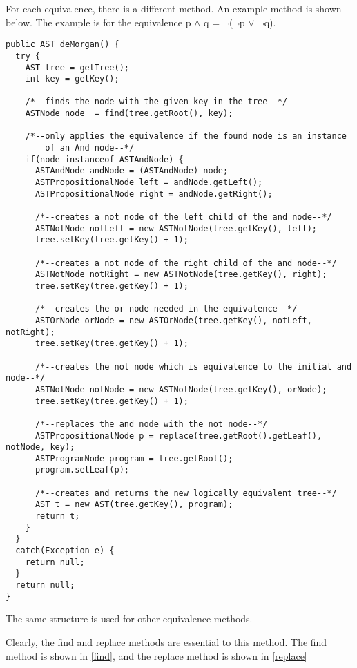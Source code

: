 \documentclass{report}
\begin{document}
For each equivalence, there is a different method. An example method is shown below. The
example is for the equivalence  p $\land$ q = $\neg$($\neg$p $\lor$ $\neg$q).

\begin{lstlisting}[caption=Example of an equivalence method, label=equiveg]
public AST deMorgan() {
  try {
    AST tree = getTree();
    int key = getKey();
		
    /*--finds the node with the given key in the tree--*/
    ASTNode node  = find(tree.getRoot(), key);

    /*--only applies the equivalence if the found node is an instance
        of an And node--*/
    if(node instanceof ASTAndNode) {
      ASTAndNode andNode = (ASTAndNode) node;
      ASTPropositionalNode left = andNode.getLeft();
      ASTPropositionalNode right = andNode.getRight();

      /*--creates a not node of the left child of the and node--*/
      ASTNotNode notLeft = new ASTNotNode(tree.getKey(), left);
      tree.setKey(tree.getKey() + 1);

      /*--creates a not node of the right child of the and node--*/
      ASTNotNode notRight = new ASTNotNode(tree.getKey(), right);
      tree.setKey(tree.getKey() + 1);

      /*--creates the or node needed in the equivalence--*/
      ASTOrNode orNode = new ASTOrNode(tree.getKey(), notLeft, notRight);
      tree.setKey(tree.getKey() + 1);

      /*--creates the not node which is equivalence to the initial and node--*/
      ASTNotNode notNode = new ASTNotNode(tree.getKey(), orNode);
      tree.setKey(tree.getKey() + 1);

      /*--replaces the and node with the not node--*/
      ASTPropositionalNode p = replace(tree.getRoot().getLeaf(), notNode, key);
      ASTProgramNode program = tree.getRoot();
      program.setLeaf(p);

      /*--creates and returns the new logically equivalent tree--*/
      AST t = new AST(tree.getKey(), program);
      return t;
    }
  }
  catch(Exception e) {
    return null;
  }
  return null;
}
\end{lstlisting}

The same structure is used for other equivalence methods.

Clearly, the find and replace methods are essential to this method. The find method
is shown in \ref{find}, and the replace method is shown in \ref{replace}
\end{document}
